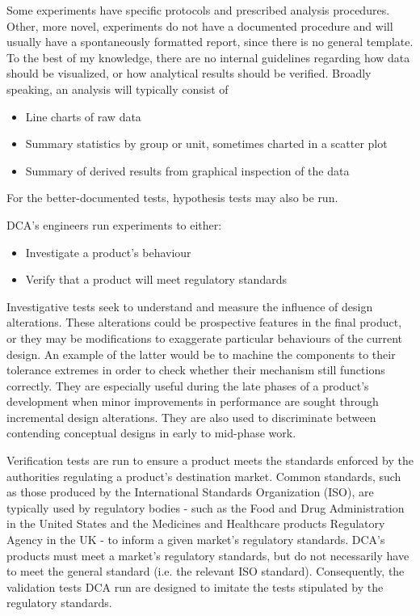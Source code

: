 \documentclass[11pt,a4paper,article]{memoir} %
\begin{document}
\begin{figure}
\label{fig:time_of_tests}
\end{figure}


 Some experiments have specific protocols and prescribed analysis procedures. Other, more novel, experiments do not have a documented procedure and will usually have a spontaneously formatted report, since there is no general template.  To the best of my knowledge, there are no internal guidelines regarding how data should be visualized, or how analytical results should be verified. Broadly speaking, an analysis will typically consist of
 \begin{itemize}
 	\item Line charts of raw data
 	\item Summary statistics by group or unit, sometimes charted in a scatter plot
 	\item Summary of derived results from graphical inspection of the data
 \end{itemize}
 For the better-documented tests, hypothesis tests may also be run.
\par
DCA's engineers run experiments to either:
\begin{itemize}
	\item Investigate a product's behaviour
	\item Verify that a product will meet regulatory standards
\end{itemize}
Investigative tests seek to understand and measure the influence of design alterations. These alterations could be prospective features in the final product, or they may be modifications to exaggerate particular behaviours of the current design. An example of the latter would be to machine the components to their tolerance extremes in order to check whether their mechanism still functions correctly. They are especially useful during the late phases of a product's development when minor improvements in performance are sought through incremental design alterations. They are also used to discriminate between contending conceptual designs in early to mid-phase work.
\par
Verification tests are run to ensure a product meets the standards enforced by the authorities regulating a product's destination market. Common standards, such as those produced by the International Standards Organization (ISO), are typically used by regulatory bodies - such as the Food and Drug Administration in the United States and the Medicines and Healthcare products Regulatory Agency in the UK - to inform a given market's regulatory standards. DCA's products must meet a market's regulatory standards, but do not necessarily have to meet the general standard (i.e. the relevant ISO standard).  Consequently, the validation tests DCA run are designed to imitate the tests stipulated by the regulatory standards.
\end{document}
